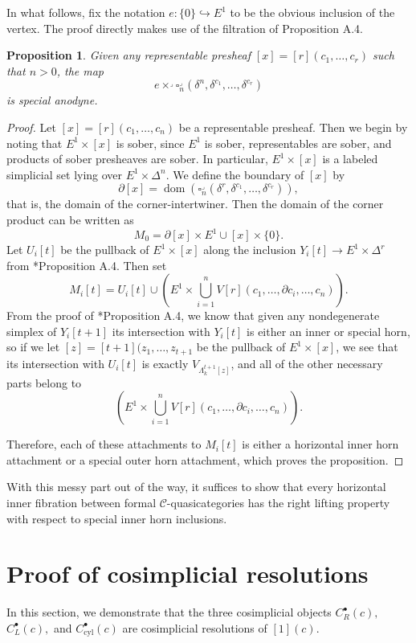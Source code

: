 \documentclass{amsart}
\numberwithin{equation}{section}
\theoremstyle{plain}   %
\newtheorem{prop}[subsection]{Proposition}
\theoremstyle{remark}
\theoremstyle{plain}
\newcommand{\C}{\ensuremath{\mathcal{C}}}
\begin{document}
In what follows, fix the notation \(e:\{0\}\hookrightarrow E^1\) to be the obvious inclusion of the vertex.  The proof directly makes use of the filtration of \cite{ds2}{Proposition A.4}.

\begin{prop} Given any representable presheaf \([x]=[r](c_1,\dots,c_r)\) such that \(n>0\), the map
	\[e \times^\lrcorner \square^\lrcorner_n(\delta^n,\delta^{c_1},\dots,\delta^{c_r})\]
	is special anodyne.
\end{prop}
\begin{proof}
	Let \([x]=[r](c_1,\dots,c_n)\) be a representable presheaf.  Then we begin by noting that \(E^1\times [x]\) is sober, since \(E^1\) is sober, representables are sober, and products of sober presheaves are sober. In particular, \(E^1\times [x]\) is a labeled simplicial set lying over \(E^1\times \Delta^n\).  We define the boundary of \([x]\) by \[\partial[x] = \operatorname{dom}\left(\square^\lrcorner_n(\delta^r, \delta^{c_1},\dots, \delta^{c_r})\right),\] that is, the domain of the corner-intertwiner.  Then the domain of the corner product can be written as \[M_0=\partial[x] \times E^1 \cup [x]\times \{0\}.\]  Let \(U_i[t]\) be the pullback of \(E^1\times [x]\) along the inclusion \(Y_i[t]\to E^1\times \Delta^r\) from \cite{ds2}*{Proposition A.4}.  Then set \[M_i[t]=U_i[t]\cup \left(E^1 \times \bigcup_{i=1}^n V[r](c_1,\dots,\partial c_i, \dots, c_n) \right).\] From the proof of \cite{ds1}*{Proposition A.4}, we know that given any nondegenerate simplex of \(Y_i[t+1]\) its intersection with \(Y_i[t]\) is either an inner or special horn, so if we let \([z]=[t+1](z_1,\dots,z_{t+1}\) be the pullback of \(E^1\times [x]\), we see that its intersection with \(U_i[t]\) is exactly \(V_{\Lambda^{t+1}_k[z]}\), and all of the other necessary parts belong to \[\left(E^1 \times \bigcup_{i=1}^n V[r](c_1,\dots,\partial c_i, \dots, c_n) \right).\]

	Therefore, each of these attachments to \(M_i[t]\) is either a horizontal inner horn attachment or a special outer horn attachment, which proves the proposition.
\end{proof}

With this messy part out of the way, it suffices to show that every horizontal inner fibration between formal \(\C\)-quasicategories has the right lifting property with respect to special inner horn inclusions.

\section{Proof of cosimplicial resolutions}\label{cosimplicial}
In this section, we demonstrate that the three cosimplicial objects \(C^\bullet_R(c),\) \(C^\bullet_L(c),\) and \(C^\bullet_{\mathrm{cyl}}(c)\) are cosimplicial resolutions of \([1](c)\).
\end{document}
